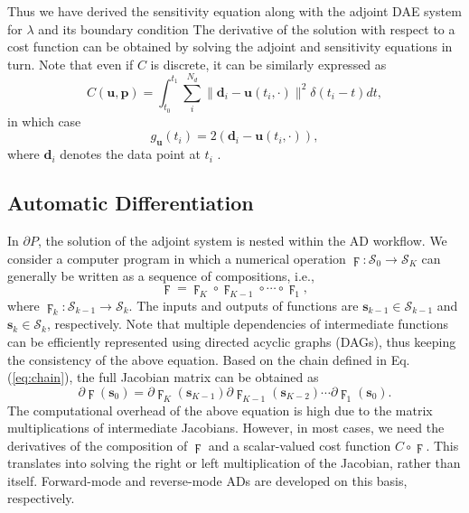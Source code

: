\documentclass[preprint,3p,12pt,sort&compress]{elsarticle}
\begin{document}
Thus we have derived the sensitivity equation along with the adjoint DAE system for $\lambda$ and its boundary condition
The derivative of the solution with respect to a cost function can be obtained by solving the adjoint and sensitivity equations in turn.
Note that even if $C$ is discrete, it can be similarly expressed as
\begin{equation}
    C(\mathbf u,\mathbf p) = \int_{t_0}^{t_1} \sum^{N_{d}}_i \|\mathbf d_i-\mathbf u(t_i,\cdot)\|^2 \delta(t_i - t) dt,
\label{eq:discrete cost}
\end{equation}
in which case
\begin{equation}
    g_{\mathbf u}(t_i)=2(\mathbf d_i-\mathbf u(t_i,\cdot)),
\end{equation}
where $\mathbf d_i$ denotes the data point at $t_i$ \cite{rackauckas2020universal}.

\subsection{Automatic Differentiation}\label{sec:ad}

In $\partial P$, the solution of the adjoint system is nested within the AD workflow.
We consider a computer program in which a numerical operation $\digamma: \mathcal S_0 \rightarrow \mathcal S_K$ can generally be written as a sequence of compositions, i.e.,
\begin{equation}
    \digamma = \digamma_K \circ \digamma_{K-1} \circ \cdots \circ \digamma_1,
\label{eq:chain}
\end{equation}
where $\digamma_k: \mathcal S_{k-1} \rightarrow \mathcal S_k$.
The inputs and outputs of functions are $\mathbf{s}_{k-1} \in \mathcal S_{k-1}$ and $\mathbf{s}_{k} \in \mathcal S_{k}$, respectively.
Note that multiple dependencies of intermediate functions can be efficiently represented using directed acyclic graphs (DAGs), thus keeping the consistency of the above equation.
Based on the chain defined in Eq.(\ref{eq:chain}), the full Jacobian matrix can be obtained as
\begin{equation}
    \partial \digamma(\mathbf s_0)=\partial \digamma_K(\mathbf s_{K-1}) \partial \digamma_{K-1}(\mathbf s_{K-2}) \cdots  \partial\digamma_{1}(\mathbf s_{0}).
\label{eq:jacobian chain}
\end{equation}
The computational overhead of the above equation is high due to the matrix multiplications of intermediate Jacobians.
However, in most cases, we need the derivatives of the composition of $\digamma$ and a scalar-valued cost function $C \circ \digamma$.
This translates into solving the right or left multiplication of the Jacobian, rather than itself.
Forward-mode and reverse-mode ADs are developed on this basis, respectively.
\end{document}
